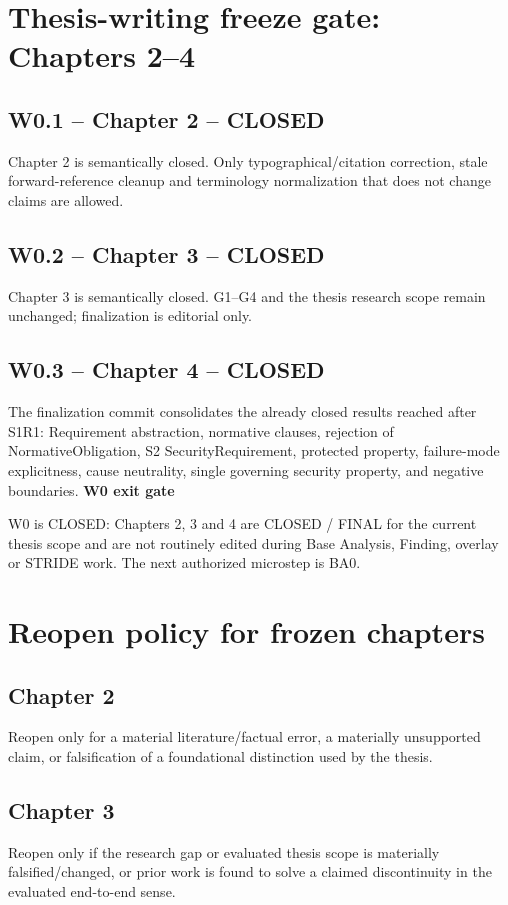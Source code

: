 \documentclass[11pt,a4paper]{article}
\newenvironment{gate}[1]{\def\FrameCommand{\fcolorbox{ddtagreen}{ddtagray}}\MakeFramed{\advance\hsize-2\width\FrameRestore}\noindent\textbf{#1}\par\smallskip}{\endMakeFramed}
\begin{document}
\section{Thesis-writing freeze gate: Chapters 2--4}
\subsection{W0.1 -- Chapter 2 -- CLOSED}
Chapter 2 is semantically closed. Only typographical/citation correction, stale forward-reference cleanup and terminology normalization that does not change claims are allowed.
\subsection{W0.2 -- Chapter 3 -- CLOSED}
Chapter 3 is semantically closed. G1--G4 and the thesis research scope remain unchanged; finalization is editorial only.
\subsection{W0.3 -- Chapter 4 -- CLOSED}
The finalization commit consolidates the already closed results reached after S1R1: Requirement abstraction, normative clauses, rejection of NormativeObligation, S2 SecurityRequirement, protected property, failure-mode explicitness, cause neutrality, single governing security property, and negative boundaries.
\begin{gate}{W0 exit gate}
W0 is CLOSED: Chapters 2, 3 and 4 are CLOSED / FINAL for the current thesis scope and are not routinely edited during Base Analysis, Finding, overlay or STRIDE work. The next authorized microstep is BA0.
\end{gate}

\section{Reopen policy for frozen chapters}
\subsection{Chapter 2}
Reopen only for a material literature/factual error, a materially unsupported claim, or falsification of a foundational distinction used by the thesis.
\subsection{Chapter 3}
Reopen only if the research gap or evaluated thesis scope is materially falsified/changed, or prior work is found to solve a claimed discontinuity in the evaluated end-to-end sense.
\end{document}

